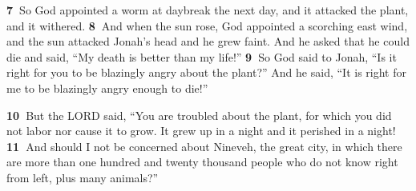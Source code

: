 \documentclass[
]{article}
\newcommand{\RL}[1]{\beginR #1\endR}
\begin{document}
\textbf{7~}So God appointed a worm at daybreak the next day, and it
attacked the plant, and it withered. \textbf{8~}And when the sun rose,
God appointed a scorching east wind, and the sun attacked Jonah\RL{'}s
head and he grew faint. And he asked that he could die and said,
\RL{``}My death is better than my life!'' \textbf{9~}So God said to
Jonah, \RL{``}Is it right for you to be blazingly angry about the
plant?'' And he said, \RL{``}It is right for me to be blazingly angry
enough to die!''

\textbf{10~}But the LORD said, \RL{``}You are troubled about the plant,
for which you did not labor nor cause it to grow. It grew up in a night
and it perished in a night! \textbf{11~}And should I not be concerned
about Nineveh, the great city, in which there are more than one hundred
and twenty thousand people who do not know right from left, plus many
animals?''
\end{document}
